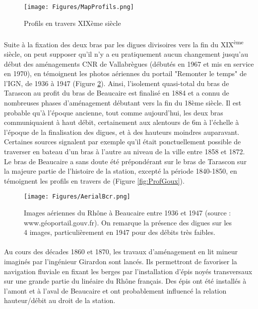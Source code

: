 \documentclass[11pt]{article}
\begin{document}
        \begin{figure}[h]
            \centering
            \texttt{[image: Figures/MapProfils.png]}
            \caption{Profils en travers XIXème siècle}
            \label{fig:Profis19eme}
        \end{figure}
            
\FloatBarrier
        \paragraph{} Suite à la fixation des deux bras par les digues divisoires vers la fin du XIX\textsuperscript{ème} siècle, on peut supposer qu'il n'y a eu pratiquement aucun changement jusqu'au début des aménagements CNR de Vallabrègues (débutés en 1967 et mis en service en 1970), en témoignent les photos aériennes du portail "Remonter le temps" de l'IGN, de 1936 à 1947 (Figure \ref{fig:AerialBcr}). Ainsi, l'isolement quasi-total du bras de Tarascon au profit du bras de Beaucaire est finalisé en 1884 et a connu de nombreuses phases d'aménagement débutant vers la fin du 18ème siècle. Il est probable qu'à l'époque ancienne, tout comme aujourd'hui, les deux bras communiquaient à haut débit, certainement aux alentours de 6m à l'échelle à l'époque de la finalisation des digues, et à des hauteurs moindres auparavant. Certaines sources signalent par exemple qu'il était ponctuellement possible de traverser en bateau d'un bras à l'autre au niveau de la ville entre 1858 et 1872. Le bras de Beaucaire a sans doute été prépondérant sur le bras de Tarascon sur la majeure partie de l'histoire de la station, excepté la période 1840-1850, en témoignent les profils en travers de \citet{goux_modification_1851} (Figure \ref{fig:ProfGoux}).
    
        \begin{figure}[h]
            \centering
        	\texttt{[image: Figures/AerialBcr.png]}
            \caption{Images aériennes du Rhône à Beaucaire entre 1936 et 1947 (source : www.géoportail.gouv.fr). On remarque la présence des digues sur les 4 images, particulièrement en 1947 pour des débits très faibles.}
            \label{fig:AerialBcr}
        \end{figure}
    
		\paragraph{} Au cours des décades 1860 et 1870, les travaux d'aménagement en lit mineur imaginés par l'ingénieur Girardon sont lancés. Ils permettront de favoriser la navigation fluviale en fixant les berges par l'installation d'épis noyés transversaux sur une grande partie du linéaire du Rhône français. Des épis ont été installés à l'amont et à l'aval de Beaucaire et ont probablement influencé la relation hauteur/débit au droit de la station.
    
\end{document}
